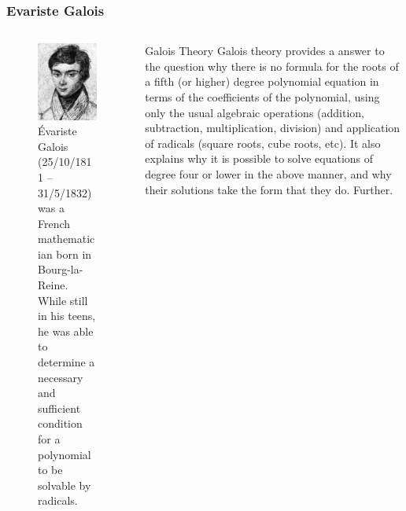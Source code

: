 \begin{frame}
	\frametitle{Evariste Galois}
	\begin{columns}
		\begin{column}{0.4\textwidth}
			\begin{figure}
				\centering
				\includegraphics[width=0.7\linewidth]{Images/Evariste_galois}
				\caption{\tiny{Évariste Galois (25/10/1811 – 31/5/1832) was a French mathematician born in Bourg-la-Reine. While still in his teens, he was able to determine a necessary and sufficient condition for a polynomial to be solvable by radicals.}}
			\end{figure}
		\end{column}
		\begin{column}{0.6 \textwidth}
			\begin{block}{Galois Theory}
				\footnotesize{
				Galois theory provides a answer to the question why there is no formula for the roots of a fifth (or higher) degree polynomial equation in terms of the coefficients of the polynomial, using only the usual algebraic operations (addition, subtraction, multiplication, division) and application of radicals (square roots, cube roots, etc). It also explains why it is possible to solve equations of degree four or lower in the above manner, and why their solutions take the form that they do. Further.}
			\end{block}
		\end{column}
	\end{columns}

\end{frame}
